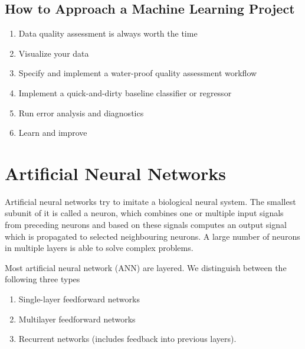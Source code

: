 \documentclass[11pt]{article}
\begin{document}
\subsection{How to Approach a Machine Learning Project}

\begin{enumerate}
    \item Data quality assessment is always worth the time
    \item Visualize your data
    \item Specify and implement a water-proof quality assessment workflow
    \item Implement a quick-and-dirty baseline classifier or regressor
    \item Run error analysis and diagnostics
    \item Learn and improve
\end{enumerate}

\section{Artificial Neural Networks}

Artificial neural networks try to imitate a biological neural system. The smallest subunit of it is called a neuron, which combines one or multiple input signals from preceding neurons and based on these signals computes an output signal which is propagated to selected neighbouring neurons. A large number of neurons in multiple layers is able to solve complex problems.

Most artificial neural network (ANN) are layered. We distinguish between the following three types
\begin{enumerate}
    \item Single-layer feedforward networks
    \item Multilayer feedforward networks
    \item Recurrent networks (includes feedback into previous layers).
\end{enumerate}
\end{document}
